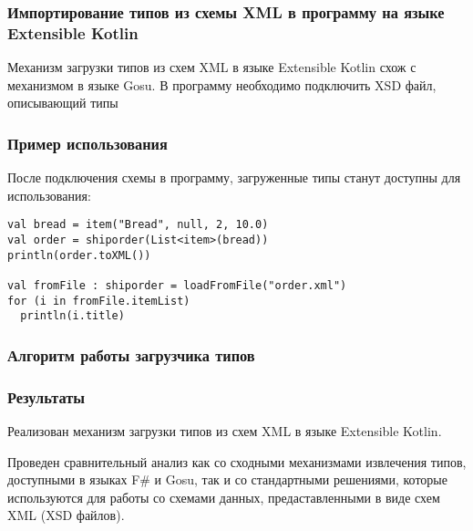 \subsubsection{Импортирование типов из схемы XML в программу на языке Extensible Kotlin}
Механизм загрузки типов из схем XML в языке Extensible Kotlin схож с механизмом в языке Gosu\td.
В программу необходимо подключить XSD файл, описывающий типы 
\td

\subsubsection{Пример использования}
После подключения схемы в программу, загруженные типы станут доступны для использования: \td

\begin{lstlisting}
val bread = item("Bread", null, 2, 10.0)
val order = shiporder(List<item>(bread))
println(order.toXML())

val fromFile : shiporder = loadFromFile("order.xml")
for (i in fromFile.itemList)
  println(i.title)
\end{lstlisting}

\subsubsection{Алгоритм работы загрузчика типов}

\subsubsection{Результаты}
Реализован механизм загрузки типов из схем XML в языке Extensible Kotlin.

Проведен сравнительный анализ как со сходными механизмами извлечения типов, доступными в языках F\# и Gosu, так и со стандартными решениями, которые используются для работы со схемами данных, предаставленными в виде схем XML (XSD файлов).